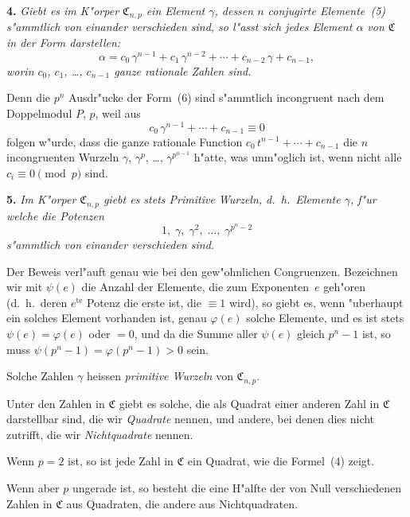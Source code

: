 \documentclass[12pt,a4paper]{article}
\theoremstyle{plain}
\theoremstyle{definition}
\theoremstyle{remark}
\begin{document}
\medskip\noindent\textbf{4.} \emph{Giebt es im K"orper $\mathfrak{C}_{n,p}$ ein Element $\gamma$, dessen $n$ conjugirte Elemente~(5) s"ammtlich von einander verschieden sind, so l"asst sich jedes Element $\alpha$ von $\mathfrak{C}$ in der Form darstellen:}
\begin{equation}\tag{6}
\alpha = c_{0}\,\gamma^{n-1} + c_{1}\,\gamma^{n-2} + \cdots + c_{n-2}\,\gamma + c_{n-1},
\end{equation}
\emph{worin $c_{0}$, $c_{1}$, \ldots, $c_{n-1}$ ganze rationale Zahlen sind.}

Denn die $p^{n}$ Ausdr"ucke der Form~(6) sind s"ammtlich incongruent nach dem Doppelmodul $P$, $p$, weil aus
\[
c_{0}\,\gamma^{n-1} + \cdots + c_{n-1} \equiv 0
\]
folgen w"urde, dass die ganze rationale Function $c_{0}\,t^{n-1} + \cdots + c_{n-1}$ die $n$ incongruenten Wurzeln $\gamma$, $\gamma^{p}$, \ldots, $\gamma^{p^{n-1}}$ h"atte, was unm"oglich ist, wenn nicht alle $c_{i} \equiv 0 \pmod{p}$ sind.

\medskip\noindent\textbf{5.} \emph{Im K"orper $\mathfrak{C}_{n,p}$ giebt es stets Primitive Wurzeln, d.~h.\ Elemente $\gamma$, f"ur welche die Potenzen}
\begin{equation}\tag{7}
1,\; \gamma,\; \gamma^{2},\; \ldots,\; \gamma^{p^{n}-2}
\end{equation}
\emph{s"ammtlich von einander verschieden sind.}

Der Beweis verl"auft genau wie bei den gew"ohnlichen Congruenzen. Bezeichnen wir mit $\psi(e)$ die Anzahl der Elemente, die zum Exponenten~$e$ geh"oren (d.~h.\ deren $e^{\text{te}}$ Potenz die erste ist, die $\equiv 1$ wird), so giebt es, wenn "uberhaupt ein solches Element vorhanden ist, genau $\varphi(e)$ solche Elemente, und es ist stets $\psi(e) = \varphi(e)$ oder $= 0$, und da die Summe aller $\psi(e)$ gleich $p^{n} - 1$ ist, so muss $\psi(p^{n} - 1) = \varphi(p^{n} - 1) > 0$ sein.

Solche Zahlen $\gamma$ heissen \emph{primitive Wurzeln} von $\mathfrak{C}_{n,p}$.

Unter den Zahlen in $\mathfrak{C}$ giebt es solche, die als Quadrat einer anderen Zahl in $\mathfrak{C}$ darstellbar sind, die wir \emph{Quadrate} nennen, und andere, bei denen dies nicht zutrifft, die wir \emph{Nichtquadrate} nennen.

Wenn $p = 2$ ist, so ist jede Zahl in $\mathfrak{C}$ ein Quadrat, wie die Formel~(4) zeigt.

Wenn aber $p$ ungerade ist, so besteht die eine H"alfte der von Null verschiedenen Zahlen in $\mathfrak{C}$ aus Quadraten, die andere aus Nichtquadraten.
\end{document}
